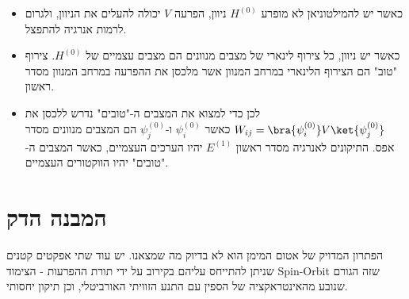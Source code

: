 \documentclass{tstextbook}
\begin{document}
\begin{summary}
  \begin{itemize}
    \item כאשר יש להמילטוניאן לא מופרע \(H^{(0)}\) ניוון, הפרעה \(V\) יכולה להעלים את הניוון, ולגרום לרמות אנרגיה להתפצל.
    \item כאשר יש ניוון, כל צירוף לינארי של מצבים מנוונים הם מצבים עצמיים של \(H^{(0)}\). צירוף "טוב" הם הצירוף הלינארי במרחב המנוון אשר מלכסן את ההפרעה במרחב המנוון מסדר ראשון.
    \item לכן כדי למצוא את המצבים ה-"טובים" נדרש ללכסן את \(W_{ij}=\bra{\psi_{i}^{(0)}}V\ket{\psi_{j}^{(0)}}\) כאשר \(\psi_{i}^{(0)}\) ו-\(\psi_{j}^{(0)}\) הם המצבים מנוונים מסדר אפס. התיקונים לאנרגיה מסדר ראשון \(E^{(1)}\) יהיו הערכים העצמיים, כאשר המצבים ה-"טובים" יהיו הווקטורים העצמיים.
  \end{itemize}
\end{summary}
\section{המבנה הדק}

הפתרון המדויק של אטום המימן הוא לא בדיוק מה שמצאנו. יש עוד שתי אפקטים קטנים שניתן להתייחס עליהם בקירוב על ידי תורת ההפרעות - הצימוד Spin-Orbit שזה הגורם שנובע מהאינטראקציה של הספין עם התנע הזוויתי האורביטלי, וכן תיקון יחסותי.
\end{document}
